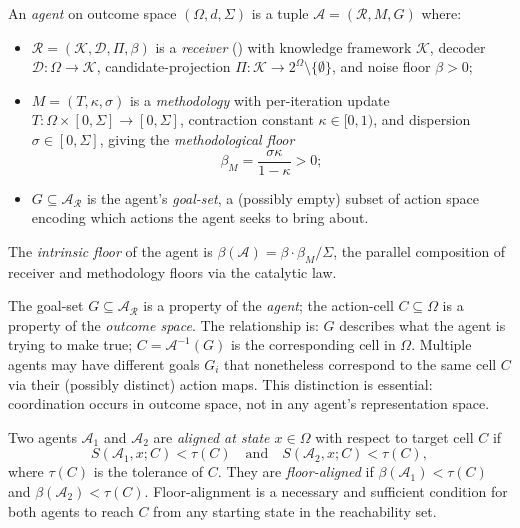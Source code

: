 \begin{definition}[Agent]
\label{def:agent}
An \emph{agent} on outcome space $(\Omega, d, \Sigma)$ is a tuple
$\mathcal{A} = (\mathcal{R}, M, G)$ where:
\begin{itemize}[leftmargin=2em]
  \item $\mathcal{R} = (\mathcal{K}, \mathcal{D}, \Pi, \beta)$ is a
    \emph{receiver} () with knowledge framework
    $\mathcal{K}$, decoder $\mathcal{D} : \Omega \to \mathcal{K}$,
    candidate-projection $\Pi : \mathcal{K} \to 2^\Omega \setminus \{\emptyset\}$,
    and noise floor $\beta > 0$;
  \item $M = (T, \kappa, \sigma)$ is a \emph{methodology} with per-iteration
    update $T : \Omega \times [0, \Sigma] \to [0, \Sigma]$, contraction
    constant $\kappa \in [0, 1)$, and dispersion $\sigma \in [0, \Sigma]$,
    giving the \emph{methodological floor}
    \[
      \beta_M = \frac{\sigma \kappa}{1 - \kappa} > 0;
    \]
  \item $G \subseteq \mathcal{A}_{\mathcal{R}}$ is the agent's
    \emph{goal-set}, a (possibly empty) subset of action space encoding
    which actions the agent seeks to bring about.
\end{itemize}
The \emph{intrinsic floor} of the agent is
$\beta(\mathcal{A}) = \beta \cdot \beta_M / \Sigma$, the parallel composition
of receiver and methodology floors via the catalytic law.
\end{definition}

\begin{remark}
\label{rem:goal-vs-cell}
The goal-set $G \subseteq \mathcal{A}_{\mathcal{R}}$ is a property of the
\emph{agent}; the action-cell $C \subseteq \Omega$ is a property of the
\emph{outcome space}.  The relationship is: $G$ describes what the agent is
trying to make true; $C = \mathcal{A}^{-1}(G)$ is the corresponding cell in
$\Omega$.  Multiple agents may have different goals $G_i$ that nonetheless
correspond to the same cell $C$ via their (possibly distinct) action maps.
This distinction is essential: coordination occurs in outcome space, not in
any agent's representation space.
\end{remark}

\begin{definition}
\label{def:signal-state-alignment}
Two agents $\mathcal{A}_1$ and $\mathcal{A}_2$ are \emph{aligned at state
$x \in \Omega$} with respect to target cell $C$ if
\[
  S(\mathcal{A}_1, x; C) < \tau(C) \quad \text{and} \quad
  S(\mathcal{A}_2, x; C) < \tau(C),
\]
where $\tau(C)$ is the tolerance of $C$.  They are \emph{floor-aligned} if
$\beta(\mathcal{A}_1) < \tau(C)$ and $\beta(\mathcal{A}_2) < \tau(C)$.
Floor-alignment is a necessary and sufficient condition for both agents to
reach $C$ from any starting state in the reachability set.
\end{definition}

